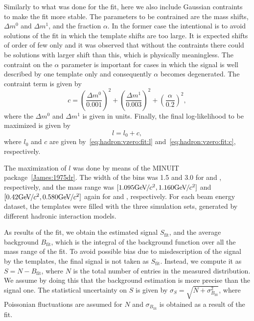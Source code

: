 Similarly to what was done for the \dedx fit,
here we also include Gaussian contraints to make the
fit more stable. The parameters to be contrained are
the mass shifts, $\Delta m^0$ and $\Delta m^1$, and the fraction
$\alpha$. In the former case the intentional is to avoid
solutions of the fit in which the template shifts are too large.
It is expected shifts of order of few \MeVc only and it was observed
that without the contraints there could be solutions with
larger shift than this, which is physically meaningless.
The contraint on the $\alpha$ parameter is important
for cases in which the signal is well described by one
template only and consequently $\alpha$ becomes
degenerated. The contraint term is given by
\begin{equation}
  c = \left(\frac{\Delta m^0}{0.001}\right)^2+\left(\frac{\Delta m^1}{0.003}\right)^2
  +\left(\frac{\alpha}{0.2}\right)^2,
  \label{eq:hadron:vzero:fit:c}
\end{equation}
where the $\Delta m^0$ and $\Delta m^1$ is given in \GeVc units.
Finally, the final log-likelihood to be maximized is given by
\begin{equation}
  l = l_0 +c,
  \label{eq:hadron:vzero:fit:l}
\end{equation}
where $l_0$ and $c$ are given by~\cref{eq:hadron:vzero:fit:l}
and~\cref{eq:hadron:vzero:fit:c}, respectively.

The maximization of $l$ was done by means of the
MINUIT package~\cref{James:1975dr}. The width
of the \minv bins was 1.5 and 3.0 \MeVcc for
\lambs and \kzeros, respectively, and the mass range
was $[1.095 \mbox{Ge\kern-0.1em V}\kern-0.1em/\kern-0.05em c^2, 1.160 \mbox{Ge\kern-0.1em V}\kern-0.1em/\kern-0.05em c^2]$ and $[0.42 \mbox{Ge\kern-0.1em V}\kern-0.1em/\kern-0.05em c^2, 0.580 \mbox{Ge\kern-0.1em V}\kern-0.1em/\kern-0.05em c^2]$  
again for \lambs and \kzeros, respectively.
For each beam energy dataset, the templates were filled
with the three simulation sets, generated by different
hadronic interaction models.

As results of the fit, we obtain the estimated signal
$S_\text{fit}$, and the average background $B_\text{fit}$, which is the integral
of the background function over all the mass range of the fit.
To avoid possible bias due to misdescription of the signal
by the templates, the final signal is not taken as $S_\text{fit}$.
Instead, we compute it as $S = N - B_\text{fit}$,
where $N$ is the total number of entries in the measured \minv distribution.
We assume by doing this that the background estimation is more precise
than the signal one.
The statistical uncertainty on $S$ is given by $\sigma_S = \sqrt{N+\sigma_{B_\text{fit}}^2}$,
where Poissonian fluctuations are assumed for $N$ and $\sigma_{B_\text{fit}}$
is obtained as a result of the fit.


